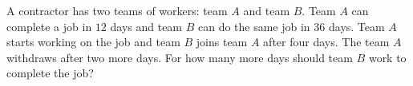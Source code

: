 A contractor has two teams of workers: team $A$ and team $B$. Team $A$ can complete a job in $12$ days and team $B$ can do the same job in $36$ days. Team $A$ starts working on the job and team $B$ joins team $A$ after four days. The team $A$ withdraws after two more days. For how many more days should team $B$ work to complete the job?
